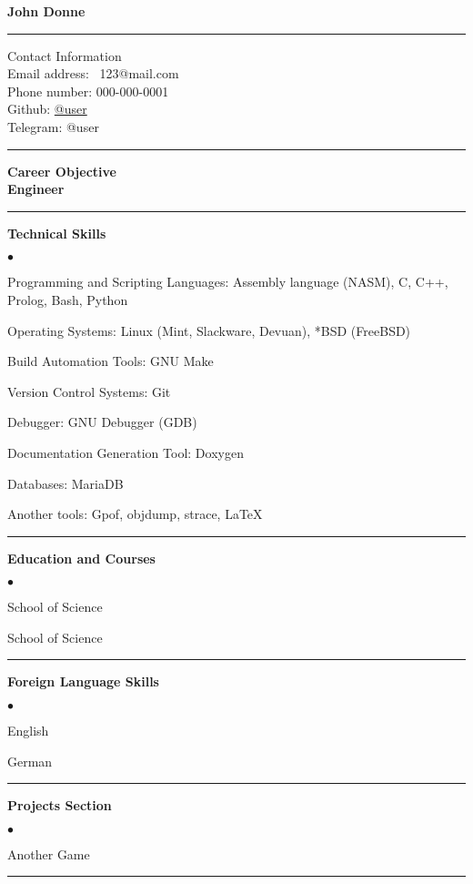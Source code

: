 \documentclass[oneside,final,12pt]{extreport}
\newenvironment{compactlist}{
	\begin{list}{{$\bullet$}}{
		\setlength\leftmargin{0.4cm}
		\setlength\partopsep{0pt}
		\setlength\parskip{0pt}
		\setlength\parsep{0pt}
		\setlength\topsep{0pt}
		\setlength\itemsep{0pt}
	}
}{
	\end{list}
}
\begin{document}
\bfseries
John Donne\\
\rule{\textwidth}{0.4pt}
Contact Information \\
\noindent
\mdseries
Email address: \
123@mail.com \\
Phone number:
000-000-0001 \\
Github: 
\href{https://github.com/user}{@user} \\
Telegram:
@user \\
\rule{\textwidth}{0.4pt}

\bfseries
Career Objective \\
\mdseries
Engineer \\
\rule{\textwidth}{0.4pt}

\bfseries
Technical Skills
\mdseries
	\begin{compactlist}
	\item Programming and Scripting Languages: Assembly language (NASM), C, C++, Prolog, Bash, Python 
	\item Operating Systems: Linux (Mint, Slackware, Devuan), *BSD (FreeBSD)
	\item Build Automation Tools: GNU Make
	\item Version Control Systems: Git
	\item Debugger: GNU Debugger (GDB)
	\item Documentation Generation Tool: Doxygen
	\item Databases: MariaDB
	\item Another tools: Gpof, objdump, strace, LaTeX
	\end{compactlist}
\rule{\textwidth}{0.4pt}

\bfseries
Education and Courses
\mdseries
\begin{compactlist}
	\item School of Science
	\item School of Science
\end{compactlist}
\rule{\textwidth}{0.4pt}

\bfseries
Foreign Language Skills
\mdseries
\begin{compactlist}
	\item English
	\item German
\end{compactlist}
\rule{\textwidth}{0.4pt}

\bfseries
Projects Section
\mdseries
\begin{compactlist}
	\item Another Game
\end{compactlist}
\rule{\textwidth}{0.4pt}
\end{document}

